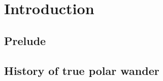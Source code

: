 \chapter{Introduction}
\label{c:intro}

\section{Prelude}



\section{History of true polar wander}

\citet{darwin1887influence}
\citet{koppen1924}

\citet{creer1954direction} 
\citet{runcorn1955rock}
\citet{creer1957geophysical}

\citet{irving1958polar}
\citet{gold1955instability}

\citet{munk1956polar}

\citet{munk1960rotation}

\citet{goldreich1969some}

\citet{ricard1993polar}

\citet{kirschvink1997evidence}




